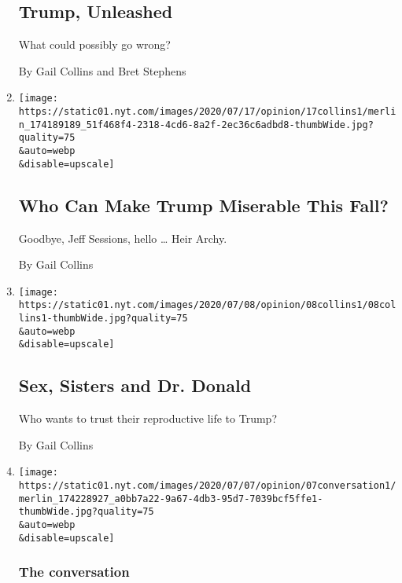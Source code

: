 \begin{enumerate}
  \hypertarget{trump-unleashed}{%
  \subsection{Trump, Unleashed}\label{trump-unleashed}}

  What could possibly go wrong?

  By Gail Collins and Bret Stephens
\item
  \href{/2020/07/15/opinion/trump-sessions-senate.html}{}

  \texttt{[image: https://static01.nyt.com/images/2020/07/17/opinion/17collins1/merlin\_174189189\_51f468f4-2318-4cd6-8a2f-2ec36c6adbd8-thumbWide.jpg?quality=75\\\&auto=webp\\\&disable=upscale]}

  \hypertarget{who-can-make-trump-miserable-this-fall}{%
  \subsection{Who Can Make Trump Miserable This
  Fall?}\label{who-can-make-trump-miserable-this-fall}}

  Goodbye, Jeff Sessions, hello \ldots{} Heir Archy.

  By Gail Collins
\item
  \href{/2020/07/08/opinion/birth-control-supreme-court.html}{}

  \texttt{[image: https://static01.nyt.com/images/2020/07/08/opinion/08collins1/08collins1-thumbWide.jpg?quality=75\\\&auto=webp\\\&disable=upscale]}

  \hypertarget{sex-sisters-and-dr-donald}{%
  \subsection{Sex, Sisters and Dr.
  Donald}\label{sex-sisters-and-dr-donald}}

  Who wants to trust their reproductive life to Trump?

  By Gail Collins
\item
  \href{/2020/07/07/opinion/trump-coronavirus-mount-rushmore.html}{}

  \texttt{[image: https://static01.nyt.com/images/2020/07/07/opinion/07conversation1/merlin\_174228927\_a0bb7a22-9a67-4db3-95d7-7039bcf5ffe1-thumbWide.jpg?quality=75\\\&auto=webp\\\&disable=upscale]}

  \hypertarget{the-conversation-2}{%
  \subsubsection{The conversation}\label{the-conversation-2}}


\end{enumerate}

